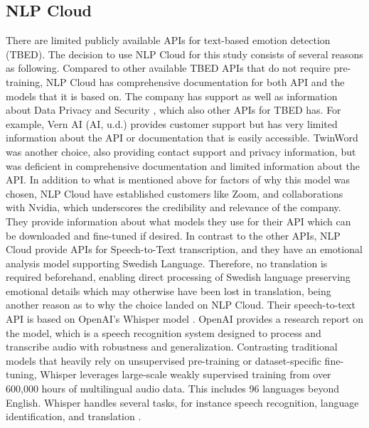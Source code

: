 \subsection{NLP Cloud}

There are limited publicly available APIs for text-based emotion detection (TBED). The decision to use NLP Cloud for this study consists of several reasons as following. Compared to other available TBED APIs that do not require pre-training, NLP Cloud has comprehensive documentation for both API and the models that it is based on. The company has support as well as information about Data Privacy and Security \autocite{NLPCloud}, which also other APIs for TBED has. For example, Vern AI (AI, u.d.) provides customer support but has very limited information about the API or documentation that is easily accessible. TwinWord \autocite{TwinWord} was another choice, also providing contact support and privacy information, but was deficient in comprehensive documentation and limited information about the API. 
In addition to what is mentioned above for factors of why this model was chosen, NLP Cloud have established customers like Zoom, and collaborations with Nvidia, which underscores the credibility and relevance of the company. They provide information about what models they use for their API which can be downloaded and fine-tuned if desired. In contrast to the other APIs, NLP Cloud provide APIs for Speech-to-Text transcription, and they have an emotional analysis model supporting Swedish Language. Therefore, no translation is required beforehand, enabling direct processing of Swedish language preserving emotional details which may otherwise have been lost in translation, being another reason as to why the choice landed on NLP Cloud. Their speech-to-text API is based on OpenAI’s Whisper model \autocite{NLPCloud}. OpenAI provides a research report on the model, which is a speech recognition system designed to process and transcribe audio with robustness and generalization. Contrasting traditional models that heavily rely on unsupervised pre-training or dataset-specific fine-tuning, Whisper leverages large-scale weakly supervised training from over 600,000 hours of multilingual audio data. This includes 96 languages beyond English. Whisper handles several tasks, for instance speech recognition, language identification, and translation \autocite{Radford2022}. 


